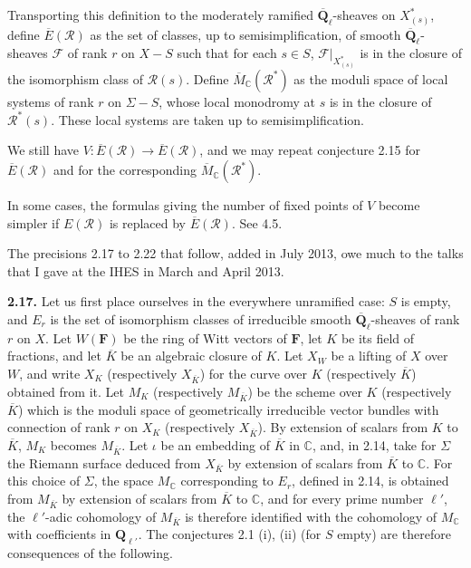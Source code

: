 \documentclass[11pt]{article}
\newcommand{\F}{\mathbf{F}}
\newcommand{\Qbl}{\overline{\mathbf{Q}}_{\ell}}
\newcommand{\C}{\mathbb{C}}
\newcommand{\Rcal}{\mathcal{R}}
\newcommand{\Fcal}{\mathcal{F}}
\newcommand{\Ebar}{\overline{E}}
\newcommand{\Mbar}{\overline{M}}
\newcommand{\para}[1]{\medskip\noindent\textbf{#1}\enspace}
\begin{document}
Transporting this definition to the moderately ramified \(\Qbl\)-sheaves on \(X^*_{(s)}\), define \(\Ebar(\Rcal)\) as the set of classes, up to semisimplification, of smooth \(\Qbl\)-sheaves \(\Fcal\) of rank \(r\) on \(X-S\) such that for each \(s\in S\), \(\Fcal|_{X^*_{(s)}}\) is in the closure of the isomorphism class of \(\Rcal(s)\). Define \(\Mbar_\C(\Rcal^*)\) as the moduli space of local systems of rank \(r\) on \(\Sigma-S\), whose local monodromy at \(s\) is in the closure of \(\Rcal^*(s)\). These local systems are taken up to semisimplification.

We still have \(V:\Ebar(\Rcal)\to\Ebar(\Rcal)\), and we may repeat conjecture 2.15 for \(\Ebar(\Rcal)\) and for the corresponding \(\Mbar_\C(\Rcal^*)\).

In some cases, the formulas giving the number of fixed points of \(V\) become simpler if \(E(\Rcal)\) is replaced by \(\Ebar(\Rcal)\). See 4.5.




The precisions 2.17 to 2.22 that follow, added in July 2013, owe much to the talks that I gave at the IHES in March and April 2013.

\para{2.17.} Let us first place ourselves in the everywhere unramified case: \(S\) is empty, and \(E_r\) is the set of isomorphism classes of irreducible smooth \(\Qbl\)-sheaves of rank \(r\) on \(X\). Let \(W(\F)\) be the ring of Witt vectors of \(\F\), let \(K\) be its field of fractions, and let \(\overline K\) be an algebraic closure of \(K\). Let \(X_W\) be a lifting of \(X\) over \(W\), and write \(X_K\) (respectively \(X_{\overline K}\)) for the curve over \(K\) (respectively \(\overline K\)) obtained from it. Let \(M_K\) (respectively \(M_{\overline K}\)) be the scheme over \(K\) (respectively \(\overline K\)) which is the moduli space of geometrically irreducible vector bundles with connection of rank \(r\) on \(X_K\) (respectively \(X_{\overline K}\)). By extension of scalars from \(K\) to \(\overline K\), \(M_K\) becomes \(M_{\overline K}\). Let \(\iota\) be an embedding of \(\overline K\) in \(\C\), and, in 2.14, take for \(\Sigma\) the Riemann surface deduced from \(X_{\overline K}\) by extension of scalars from \(\overline K\) to \(\C\). For this choice of \(\Sigma\), the space \(M_\C\) corresponding to \(E_r\), defined in 2.14, is obtained from \(M_{\overline K}\) by extension of scalars from \(\overline K\) to \(\C\), and for every prime number \(\ell'\), the \(\ell'\)-adic cohomology of \(M_{\overline K}\) is therefore identified with the cohomology of \(M_\C\) with coefficients in \(\mathbf{Q}_{\ell'}\). The conjectures 2.1 (i), (ii) (for \(S\) empty) are therefore consequences of the following.
\end{document}
